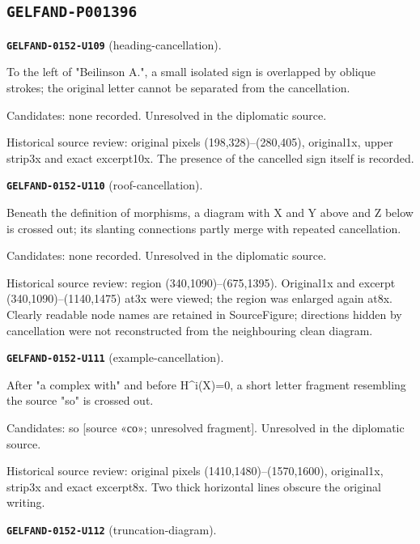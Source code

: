 \subsection*{\texttt{GELFAND-P001396}}
\par\noindent\leavevmode{}\label{GELFAND-0152-U109}\textbf{\texttt{GELFAND-0152-U109}} (heading-cancellation).\nopagebreak[4]\par
To the left of "Beilinson A.", a small isolated sign is overlapped by oblique strokes; the original letter cannot be separated from the cancellation.\par
Candidates: none recorded. Unresolved in the diplomatic source.\par
Historical source review: original pixels (198,328)–(280,405), original1x, upper strip3x and exact excerpt10x. The presence of the cancelled sign itself is recorded.\par\medskip
\par\noindent\leavevmode{}\label{GELFAND-0152-U110}\textbf{\texttt{GELFAND-0152-U110}} (roof-cancellation).\nopagebreak[4]\par
Beneath the definition of morphisms, a diagram with X and Y above and Z below is crossed out; its slanting connections partly merge with repeated cancellation.\par
Candidates: none recorded. Unresolved in the diplomatic source.\par
Historical source review: region (340,1090)–(675,1395). Original1x and excerpt (340,1090)–(1140,1475) at3x were viewed; the region was enlarged again at8x. Clearly readable node names are retained in SourceFigure; directions hidden by cancellation were not reconstructed from the neighbouring clean diagram.\par\medskip
\par\noindent\leavevmode{}\label{GELFAND-0152-U111}\textbf{\texttt{GELFAND-0152-U111}} (example-cancellation).\nopagebreak[4]\par
After "a complex with" and before H\textasciicircum{}i(X)=0, a short letter fragment resembling the source "so" is crossed out.\par
Candidates: so [source «со»; unresolved fragment]. Unresolved in the diplomatic source.\par
Historical source review: original pixels (1410,1480)–(1570,1600), original1x, strip3x and exact excerpt8x. Two thick horizontal lines obscure the original writing.\par\medskip
\par\noindent\leavevmode{}\label{GELFAND-0152-U112}\textbf{\texttt{GELFAND-0152-U112}} (truncation-diagram).\nopagebreak[4]\par
